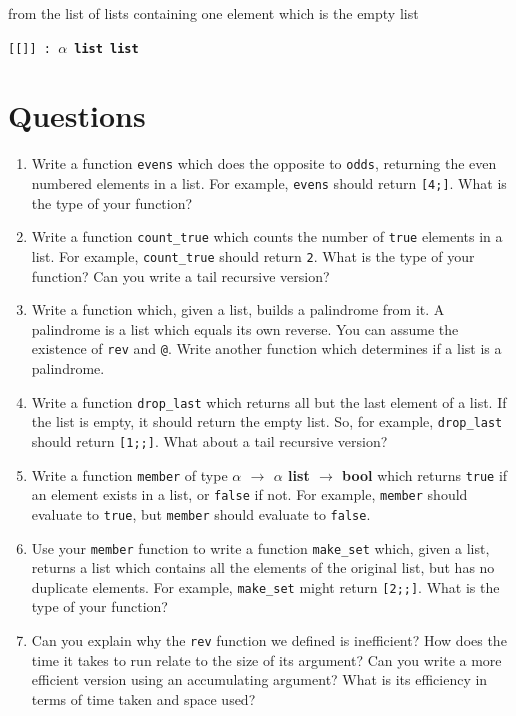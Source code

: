 \documentclass[]{book}
\newcommand{\smspace}{\vspace{4mm}}
\begin{document}
\noindent from the list of lists containing one element which is the empty list

\smspace
\texttt{[[]] :\ \textrm{\textbf{$\alpha$ list list}}}
\smspace


\clearpage
\section*{Questions}

\begin{enumerate}
  \item Write a function \texttt{evens} which does the opposite to \texttt{odds}, returning the even numbered elements in a list. For example, \texttt{evens\! [2;\! 4;\! 2;\! 4;\! 2]} should return \texttt{[4;]}. What is the type of your function?
  \item Write a function \texttt{count\_true} which counts the number of \texttt{true} elements in a list. For example, \texttt{count\_true} should return \texttt{2}. What is the type of your function? Can you write a tail recursive version?
  \item Write a function which, given a list, builds a palindrome from it. A palindrome is a list which equals its own reverse. You can assume the existence of \texttt{rev} and \texttt{@}. Write another function which determines if a list is a palindrome.
  \item Write a function \texttt{drop\_last} which returns all but the last element of a list. If the list is empty, it should return the empty list. So, for example, \texttt{drop\_last\! [1;\! 2;\! 4;\! 8]} should return \texttt{[1;;]}. What about a tail recursive version?
  \item Write a function \texttt{member} of type \textbf{\textrm {$\alpha$ $\rightarrow$ $\alpha$ list $\rightarrow$ bool}} which returns \texttt{true} if an element exists in a list, or \texttt{false} if not. For example, \texttt{member\! [1;\! 2;\! 3]} should evaluate to \texttt{true}, but \texttt{member\! [1;\! 2]} should evaluate to \texttt{false}. 
  \item Use your \texttt{member} function to write a function \texttt{make\_set} which, given a list, returns a list which contains all the elements of the original list, but has no duplicate elements. For example, \texttt{make\_set\! [1;\! 2;\! 3;\! 3;\! 1]} might return \texttt{[2;;]}. What is the type of your function?
  \item Can you explain why the \texttt{rev} function we defined is inefficient? How does the time it takes to run relate to the size of its argument? Can you write a more efficient version using an accumulating argument? What is its efficiency in terms of time taken and space used?
\end{enumerate}
\end{document}
